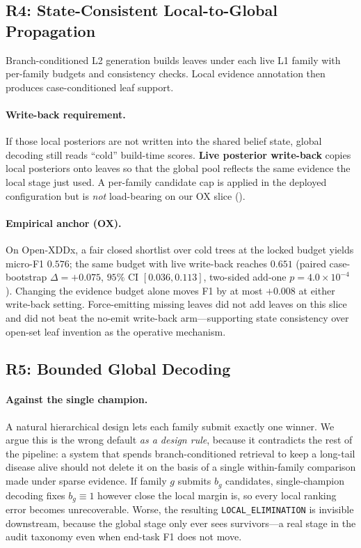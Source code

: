 \subsection{R4: State-Consistent Local-to-Global Propagation}
\label{sec:m4}

Branch-conditioned L2 generation builds leaves under each live L1 family with per-family budgets and consistency checks.
Local evidence annotation then produces case-conditioned leaf support.

\paragraph{Write-back requirement.}
If those local posteriors are not written into the shared belief state, global decoding still reads ``cold'' build-time scores.
\textbf{Live posterior write-back} copies local posteriors onto leaves so that the global pool reflects the same evidence the local stage just used.
A per-family candidate cap is applied in the deployed configuration but is \emph{not} load-bearing on our OX slice ().

\paragraph{Empirical anchor (OX).}
On Open-XDDx, a fair closed shortlist over cold trees at the locked budget yields micro-F1 $0.576$; the same budget with live write-back reaches $0.651$ (paired case-bootstrap $\Delta{=}{+}0.075$, $95\%$ CI $[0.036,0.113]$, two-sided add-one $p{=}4.0{\times}10^{-4}$).
Changing the evidence budget alone moves F1 by at most ${+}0.008$ at either write-back setting.
Force-emitting missing leaves did not add leaves on this slice and did not beat the no-emit write-back arm---supporting state consistency over open-set leaf invention as the operative mechanism.

\subsection{R5: Bounded Global Decoding}
\label{sec:m5}

\paragraph{Against the single champion.}
A natural hierarchical design lets each family submit exactly one winner.
We argue this is the wrong default \emph{as a design rule}, because it contradicts the rest of the pipeline: a system that spends branch-conditioned retrieval to keep a long-tail disease alive should not delete it on the basis of a single within-family comparison made under sparse evidence.
If family $g$ submits $b_g$ candidates, single-champion decoding fixes $b_g \equiv 1$ however close the local margin is, so every local ranking error becomes unrecoverable.
Worse, the resulting \texttt{LOCAL\_ELIMINATION} is invisible downstream, because the global stage only ever sees survivors---a real stage in the audit taxonomy even when end-task F1 does not move.


